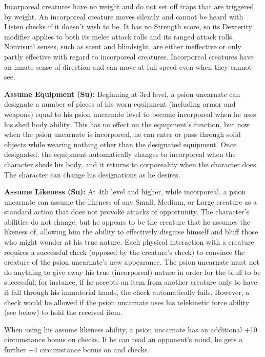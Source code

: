 {Incorporeal creatures have no weight and do not set off traps that are triggered by weight. An incorporeal creature moves silently and cannot be heard with Listen checks if it doesn't wish to be. It has no Strength score, so its Dexterity modifier applies to both its melee attack rolls and its ranged attack rolls. Nonvisual senses, such as scent and blindsight, are either ineffective or only partly effective with regard to incorporeal creatures. Incorporeal creatures have an innate sense of direction and can move at full speed even when they cannot see.

\textbf{Assume Equipment (Su):} Beginning at 3rd level, a psion uncarnate can designate a number of pieces of his worn equipment (including armor and weapons) equal to his psion uncarnate level to become incorporeal when he uses his shed body ability. This has no effect on the equipment's function, but now when the psion uncarnate is incorporeal, he can enter or pass through solid objects while wearing nothing other than the designated equipment. Once designated, the equipment automatically changes to incorporeal when the character sheds his body, and it returns to corporeality when the character does. The character can change his designations as he desires.

\textbf{Assume Likeness (Su):} At 4th level and higher, while incorporeal, a psion uncarnate can assume the likeness of any Small, Medium, or Large creature as a standard action that does not provoke attacks of opportunity. The character's abilities do not change, but he appears to be the creature that he assumes the likeness of, allowing him the ability to effectively disguise himself and bluff those who might wonder at his true nature. Each physical interaction with a creature requires a successful  check (opposed by the creature's  check) to convince the creature of the psion uncarnate's new appearance. The psion uncarnate must not do anything to give away his true (incorporeal) nature in order for the bluff to be successful; for instance, if he accepts an item from another creature only to have it fall through his immaterial hands, the  check automatically fails. However, a  check would be allowed if the psion uncarnate uses his telekinetic force ability (see below) to hold the received item.

When using his assume likeness ability, a psion uncarnate has an additional +10 circumstance bonus on  checks. If he can read an opponent's mind, he gets a further +4 circumstance bonus on  and  checks.

}
